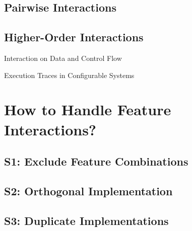 \documentclass[
	aspectratio=169, %
	8pt, %
	handout, %
]{beamer}
\begin{document}
\subsection{Pairwise Interactions}
\subsection{Higher-Order Interactions}

\begin{frame}{Interaction on Data and Control Flow \mytitlesource{\essentialconfigurationcomplexity}}
	\centering
\end{frame}
\begin{frame}{Execution Traces in Configurable Systems \mytitlesource{\essentialconfigurationcomplexity}}
\end{frame}



%

\lessonslearned{
	\item \ldots
}{
	\item \ldots
}{
	\ldots
}

\sectionend

\section{How to Handle Feature Interactions?}

\subsection{S1: Exclude Feature Combinations}
\subsection{S2: Orthogonal Implementation}
\subsection{S3: Duplicate Implementations}
\end{document}
